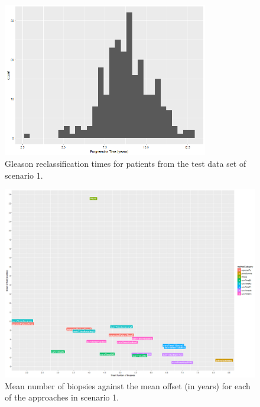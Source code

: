\begin{figure}[H]
\centering
\captionsetup{justification=centering}
\includegraphics[width=0.8\textwidth]{sim_study_res_sc_10_sh_7pt5/progression_hist.png}
\caption{\label{fig : sc_10_sh_7pt5_progression_hist} Gleason reclassification times for patients from the test data set of scenario 1.}
\end{figure}

\begin{figure}[H]
\centering
\captionsetup{justification=centering}
\includegraphics[width=\textwidth]{sim_study_res_sc_10_sh_7pt5/mean_offsetvsnb.png}
\caption{\label{fig : sc_10_sh_7pt5_mean_offsetvsnb} Mean number of biopsies against the mean offset (in years) for each of the approaches in scenario 1.}
\end{figure}


